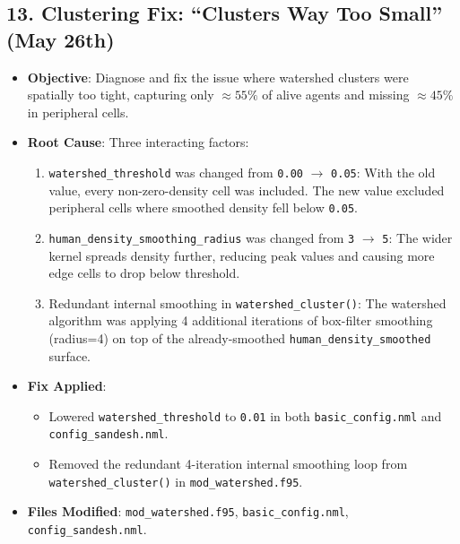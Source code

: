 \subsection{13. Clustering Fix: ``Clusters Way Too Small'' (May 26th)}
\begin{itemize}
\item \textbf{Objective}: Diagnose and fix the issue where watershed clusters were spatially too tight, capturing only $\approx 55\%$ of alive agents and missing $\approx 45\%$ in peripheral cells.
\item \textbf{Root Cause}: Three interacting factors:
\begin{enumerate}
\item \texttt{watershed\_threshold} was changed from \texttt{0.00} $\rightarrow$ \texttt{0.05}: With the old value, every non-zero-density cell was included. The new value excluded peripheral cells where smoothed density fell below \texttt{0.05}.
\item \texttt{human\_density\_smoothing\_radius} was changed from \texttt{3} $\rightarrow$ \texttt{5}: The wider kernel spreads density further, reducing peak values and causing more edge cells to drop below threshold.
\item Redundant internal smoothing in \texttt{watershed\_cluster()}: The watershed algorithm was applying 4 additional iterations of box-filter smoothing (radius=4) on top of the already-smoothed \texttt{human\_density\_smoothed} surface.
\end{enumerate}
\item \textbf{Fix Applied}:
\begin{itemize}
\item Lowered \texttt{watershed\_threshold} to \texttt{0.01} in both \texttt{basic\_config.nml} and \texttt{config\_sandesh.nml}.
\item Removed the redundant 4-iteration internal smoothing loop from \texttt{watershed\_cluster()} in \texttt{mod\_watershed.f95}.
\end{itemize}
\item \textbf{Files Modified}: \texttt{mod\_watershed.f95}, \texttt{basic\_config.nml}, \texttt{config\_sandesh.nml}.
\end{itemize}

